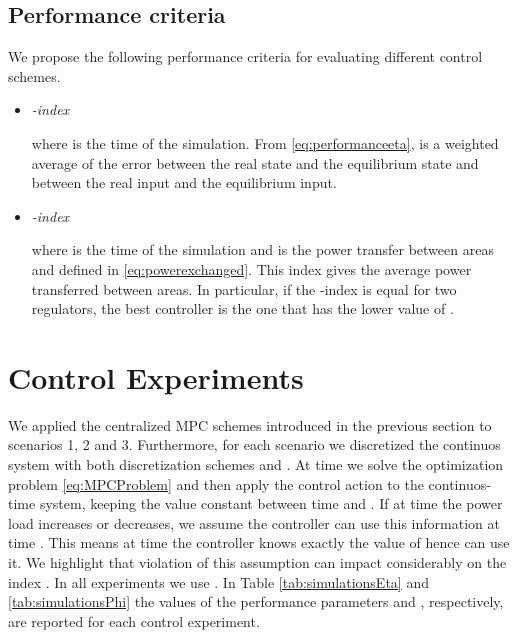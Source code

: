 \documentclass[a4paper]{article}
\begin{document}
          \subsection{Performance criteria}
               We propose the following performance criteria for evaluating different control schemes.
               \begin{itemize}
               \item\emph{-index}
                 
                 where  is the time of the simulation. From \eqref{eq:performanceeta},  is a weighted average of the error between the real state and the equilibrium state and between the real input and the equilibrium input.
               \item \emph{-index}
                 
                 where  is the time of the simulation and  is the power transfer between areas  and  defined in \eqref{eq:powerexchanged}. This index gives the average power transferred between areas. In particular, if the -index is equal for two regulators, the best controller is the one that has the lower value of .
               \end{itemize}
               


     \section{Control Experiments}
          We applied the centralized MPC schemes introduced in the previous section to scenarios 1, 2 and 3. Furthermore, for each scenario we discretized the continuos system with both discretization schemes  and . At time  we solve the optimization problem \eqref{eq:MPCProblem} and then apply the control action to the continuos-time system, keeping the value constant between time  and . If at time  the power load increases or decreases, we assume the controller can use this information at time . This means at time  the controller knows exactly the value of  hence can use it. We highlight that violation of this assumption can impact considerably on the index . In all experiments we use . In Table \ref{tab:simulationsEta} and \ref{tab:simulationsPhi} the values of the performance parameters  and , respectively, are reported for each control experiment. 
\end{document}
